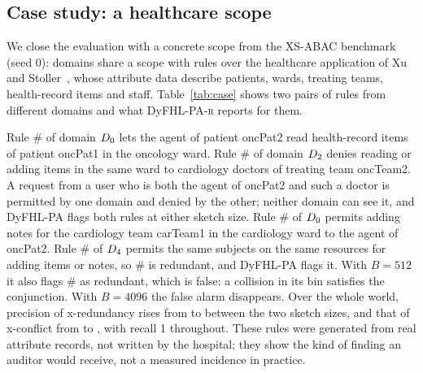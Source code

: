 \documentclass[preprint,12pt]{elsarticle}
\theoremstyle{definition}
\newcommand{\name}{DyFHL-PA\xspace}
\newcommand{\R}{\textsc{r}}
\begin{document}
\begin{table}[t]
\caption{Naturally occurring anomalies only (no injection): prevalence per task and macro-F1 of \name-\R{} for three sketch sizes (mean $\pm$ std, three seeds).}
\label{tab:natural}
\centering\footnotesize
{}
\end{table}

\subsection{Case study: a healthcare scope}
\label{sec:case}
We close the evaluation with a concrete scope from the XS-ABAC benchmark (seed 0): \csnmembers{} domains share a scope with \csnrules{} rules over the healthcare application of Xu and Stoller~\cite{xu2015mining}, whose attribute data describe patients, wards, treating teams, health-record items and staff. Table~\ref{tab:case} shows two pairs of rules from different domains and what \name-\R{} reports for them.

Rule \#\csconfauid{} of domain $D_{0}$ lets the agent of patient oncPat2 read health-record items of patient oncPat1 in the oncology ward. Rule \#\csconfbuid{} of domain $D_{2}$ denies reading or adding items in the same ward to cardiology doctors of treating team oncTeam2. A request from a user who is both the agent of oncPat2 and such a doctor is permitted by one domain and denied by the other; neither domain can see it, and \name flags both rules at either sketch size. Rule \#\csredauid{} of $D_{0}$ permits adding notes for the cardiology team carTeam1 in the cardiology ward to the agent of oncPat2. Rule \#\csredbuid{} of $D_{4}$ permits the same subjects on the same resources for adding items or notes, so \#\csredauid{} is redundant, and \name flags it. With $B=512$ it also flags \#\csredbuid{} as redundant, which is false: a collision in its bin satisfies the conjunction. With $B=4096$ the false alarm disappears. Over the whole world, precision of x-redundancy rises from \csredprecBdxii{} to \csredprecBmmmmxcvi{} between the two sketch sizes, and that of x-conflict from \csconfprecBdxii{} to \csconfprecBmmmmxcvi, with recall 1 throughout. These rules were generated from real attribute records, not written by the hospital; they show the kind of finding an auditor would receive, not a measured incidence in practice.
\end{document}
